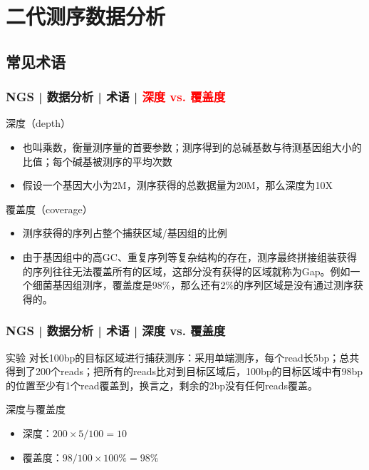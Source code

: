\section{二代测序数据分析}

\subsection{常见术语}
\begin{frame}
  \frametitle{NGS | 数据分析 | 术语 | \textcolor{red}{深度 vs. 覆盖度}}
  \begin{block}{深度（depth）}
    \begin{itemize}
      \item 也叫乘数，衡量测序量的首要参数；测序得到的总碱基数与待测基因组大小的比值；每个碱基被测序的平均次数
      \item 假设一个基因大小为2M，测序获得的总数据量为20M，那么深度为10X
    \end{itemize}
  \end{block}
  \pause
  \begin{block}{覆盖度（coverage）}
    \begin{itemize}
      \item 测序获得的序列占整个捕获区域/基因组的比例
      \item 由于基因组中的高GC、重复序列等复杂结构的存在，测序最终拼接组装获得的序列往往无法覆盖所有的区域，这部分没有获得的区域就称为Gap。例如一个细菌基因组测序，覆盖度是98\%，那么还有2\%的序列区域是没有通过测序获得的。
    \end{itemize}
  \end{block}
\end{frame}

\begin{frame}
  \frametitle{NGS | 数据分析 | 术语 | 深度 vs. 覆盖度}
  \begin{block}{实验}
对长100bp的目标区域进行捕获测序：采用单端测序，每个read长5bp；总共得到了200个reads；把所有的reads比对到目标区域后，100bp的目标区域中有98bp的位置至少有1个read覆盖到，换言之，剩余的2bp没有任何reads覆盖。
  \end{block}
  \pause
  \begin{block}{深度与覆盖度}
    \begin{itemize}
      \item 深度：$200 \times 5 / 100 = 10$
      \item 覆盖度：$98 / 100 \times 100\% = 98\%$
    \end{itemize}
  \end{block}
\end{frame}

